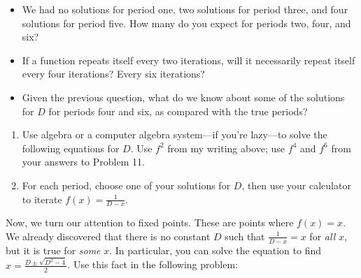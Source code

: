 \documentclass[../gatm.tex]{subfiles}
\begin{document}
\begin{itemize}
\item We had no solutions for period one, two solutions for period three, and four solutions for period five. How many do you expect for periods two, four, and six?
\item If a function repeats itself every two iterations, will it necessarily repeat itself every four iterations? Every six iterations?
\item Given the previous question, what do we know about some of the solutions for $D$ for periods four and six, as compared with the true periods?
\end{itemize}
\begin{enumerate}
\setcounter{enumi}{\value{problem_i}}
\item Use algebra or a computer algebra system---if you're lazy---to solve the following equations for $D$. Use $f^2$ from my writing above; use $f^4$ and $f^6$ from your answers to Problem 11.
\begin{enumerate}
\end{enumerate}
\item For each period, choose one of your solutions for $D$, then use your calculator to iterate $f(x)=\frac{1}{D-x}$.
\begin{enumerate}
\end{enumerate}
\setcounter{problem_i}{\value{enumi}}
\end{enumerate}

\noindent Now, we turn our attention to fixed points. These are points where $f(x)=x$. We already discovered that there is no constant $D$ such that $\frac{1}{D-x}=x$ for \textit{all} $x$, but it is true for \textit{some} $x$. In particular, you can solve the equation to find $x=\frac{D\pm \sqrt{D^2-4}}{2}$. Use this fact in the following problem:
\end{document}
